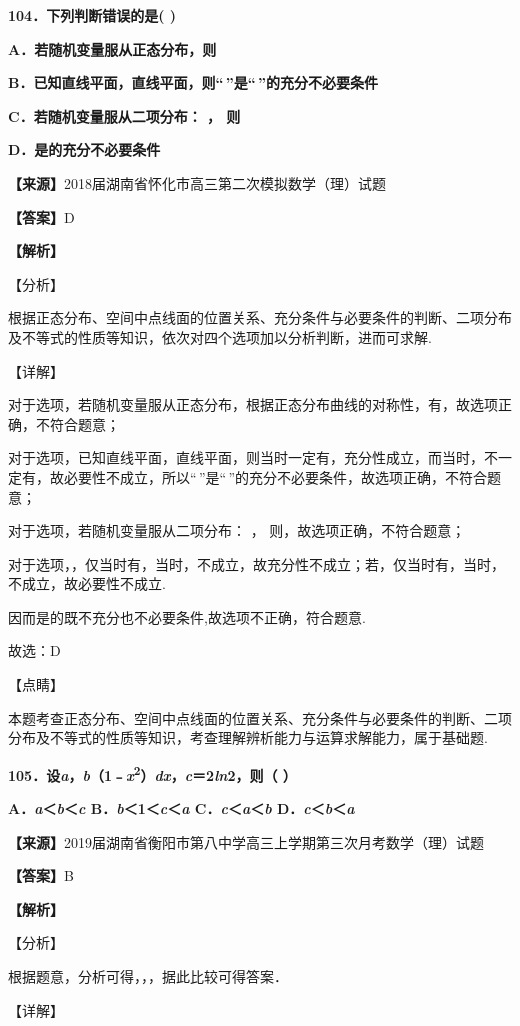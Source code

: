 \textbf{104．下列判断错误的是( )}

\textbf{A．若随机变量服从正态分布，则}

\textbf{B．已知直线平面，直线平面，则``\,''是``\,''的充分不必要条件}

\textbf{C．若随机变量服从二项分布： ， 则}

\textbf{D．是的充分不必要条件}

\textbf{【来源】}2018届湖南省怀化市高三第二次模拟数学（理）试题

\textbf{【答案】}D

\textbf{【解析】}

【分析】

根据正态分布、空间中点线面的位置关系、充分条件与必要条件的判断、二项分布及不等式的性质等知识，依次对四个选项加以分析判断，进而可求解.

【详解】

对于选项，若随机变量服从正态分布，根据正态分布曲线的对称性，有，故选项正确，不符合题意；

对于选项，已知直线平面，直线平面，则当时一定有，充分性成立，而当时，不一定有，故必要性不成立，所以``\,''是``\,''的充分不必要条件，故选项正确，不符合题意；

对于选项，若随机变量服从二项分布： ， 则，故选项正确，不符合题意；

对于选项，，仅当时有，当时，不成立，故充分性不成立；若，仅当时有，当时，不成立，故必要性不成立.

因而是的既不充分也不必要条件,故选项不正确，符合题意.

故选：D

【点睛】

本题考查正态分布、空间中点线面的位置关系、充分条件与必要条件的判断、二项分布及不等式的性质等知识，考查理解辨析能力与运算求解能力，属于基础题.

\textbf{105．设\emph{a}，\emph{b}（1﹣\emph{x}\textsuperscript{2}）\emph{dx}，\emph{c}＝2\emph{ln}2，则（
）}

\textbf{A．\emph{a}＜\emph{b}＜\emph{c}
B．\emph{b}＜1＜\emph{c}＜\emph{a} C．\emph{c}＜\emph{a}＜\emph{b}
D．\emph{c}＜\emph{b}＜\emph{a}}

\textbf{【来源】}2019届湖南省衡阳市第八中学高三上学期第三次月考数学（理）试题

\textbf{【答案】}B

\textbf{【解析】}

【分析】

根据题意，分析可得，，，据此比较可得答案．

【详解】

